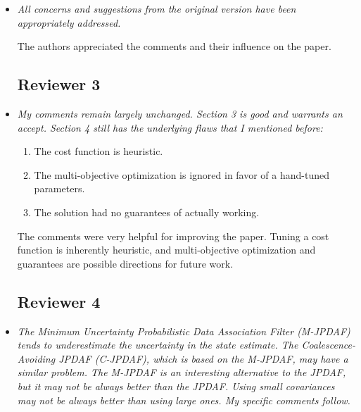 \documentclass[11pt]{article}
\begin{document}
\begin{itemize}

\subsection*{Reviewer 2}
\item {\itshape All concerns and suggestions from the original version have been appropriately addressed.}

The authors appreciated the comments and their influence on the paper.

\subsection*{Reviewer 3}
\item {\itshape My comments remain largely unchanged. Section 3 is good and warrants an accept. Section 4 still has the underlying flaws that I mentioned before:
\begin{enumerate}
	\item The cost function is heuristic.
	\item The multi-objective optimization is ignored in favor of a hand-tuned parameters.
	\item The solution had no guarantees of actually working.
\end{enumerate}
}

The comments were very helpful for improving the paper. Tuning a cost function is inherently heuristic, and multi-objective optimization and guarantees are possible directions for future work.
		


\subsection*{Reviewer 4}
\item {\itshape The Minimum Uncertainty Probabilistic Data Association Filter (M-JPDAF) tends to underestimate the uncertainty in the state estimate. The Coalescence- Avoiding JPDAF (C-JPDAF), which is based on the M-JPDAF, may have a similar problem. The M-JPDAF is an interesting alternative to the JPDAF, but it may not be always better than the JPDAF. Using small covariances may not be always better than using large ones. My specific comments follow.}


\end{itemize}
\end{document}
